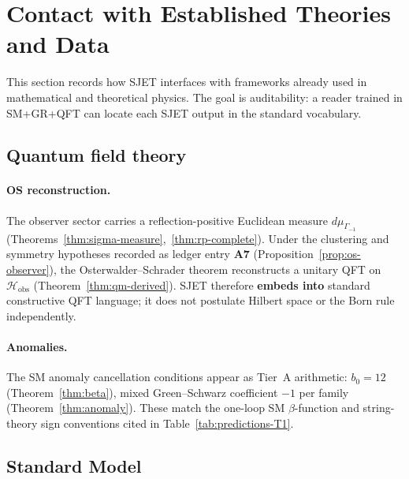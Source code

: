 \section{Contact with Established Theories and Data}
\label{sec:standard-theories}

This section records how SJET interfaces with frameworks already used in
mathematical and theoretical physics. The goal is auditability: a reader
trained in SM+GR+QFT can locate each SJET output in the standard vocabulary.

\subsection{Quantum field theory}
\label{sec:standard-theories:qft}

\paragraph{OS reconstruction.}
The observer sector carries a reflection-positive Euclidean measure
$d\mu_{\Gamma_{-1}}$ (Theorems~\ref{thm:sigma-measure},~\ref{thm:rp-complete}).
Under the clustering and symmetry hypotheses recorded as ledger entry
\textbf{A7} (Proposition~\ref{prop:os-observer}), the Osterwalder--Schrader theorem
\cite{OsterwalderSchrader1973} reconstructs a unitary QFT on
$\mathcal{H}_{\mathrm{obs}}$ (Theorem~\ref{thm:qm-derived}). SJET therefore
\textbf{embeds into} standard constructive QFT language; it does not postulate
Hilbert space or the Born rule independently.

\paragraph{Anomalies.}
The SM anomaly cancellation conditions appear as Tier~A arithmetic:
$b_0=12$ (Theorem~\ref{thm:beta}), mixed Green--Schwarz coefficient $-1$ per
family (Theorem~\ref{thm:anomaly}). These match the one-loop SM $\beta$-function
and string-theory sign conventions cited in Table~\ref{tab:predictions-T1}.

\subsection{Standard Model}
\label{sec:standard-theories:sm}

